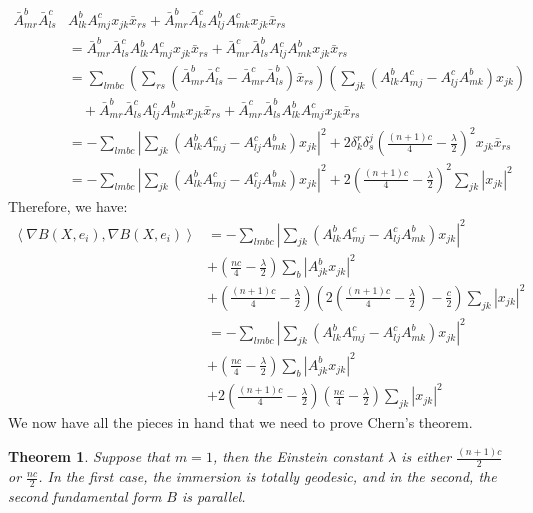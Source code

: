 \documentclass[11pt]{amsart}
\newtheorem{thm}[subsection]{Theorem}
\theoremstyle{definition}
\def \la { \left\langle }
\def \ra { \right\rangle }
\begin{document}
\begin{align*}
\bar{A}^b_{mr} \bar{A}^c_{ls} & A^b_{lk} A^c_{mj} x_{jk} \bar{x}_{rs} + \bar{A}^b_{mr} \bar{A}^c_{ls} A^b_{lj} A^c_{mk} x_{jk} \bar{x}_{rs} \\ 
&= \bar{A}^b_{mr} \bar{A}^c_{ls} A^b_{lk} A^c_{mj} x_{jk} \bar{x}_{rs} + \bar{A}^c_{mr} \bar{A}^b_{ls} A^c_{lj} A^b_{mk} x_{jk} \bar{x}_{rs} \\
&=  \sum_{lmbc} \left( \sum_{rs} ( \bar{A}^b_{mr} \bar{A}^c_{ls} - \bar{A}^c_{mr} \bar{A}^b_{ls} ) \bar{x}_{rs} \right) \left( \sum_{jk} ( A^b_{lk} A^c_{mj} -  A^c_{lj} A^b_{mk} ) x_{jk} \right)\\
&\quad +  \bar{A}^b_{mr} \bar{A}^c_{ls} A^c_{lj} A^b_{mk} x_{jk} \bar{x}_{rs} + \bar{A}^c_{mr} \bar{A}^b_{ls} A^b_{lk} A^c_{mj} x_{jk} \bar{x}_{rs} \\
&= - \sum_{lmbc} \left| \sum_{jk} \left( A^b_{lk} A^c_{mj} -  A^c_{lj} A^b_{mk}  \right) x_{jk} \right|^2 + 2 \delta^r_k \delta^j_s \left( \frac{(n+1)c}{4} - \frac{\lambda}{2} \right)^2 x_{jk} \bar{x}_{rs} \\
&= - \sum_{lmbc} \left| \sum_{jk} \left( A^b_{lk} A^c_{mj} -  A^c_{lj} A^b_{mk} \right) x_{jk} \right|^2 + 2 \left( \frac{(n+1)c}{4} - \frac{\lambda}{2} \right)^2 \sum_{jk} \left| x_{jk} \right|^2
\end{align*}
%
Therefore, we have:
%
\begin{align*}
\la \nabla B (X, e_i), \nabla B(X, e_i) \ra &= - \sum_{lmbc} \left| \sum_{jk} \left( A^b_{lk} A^c_{mj} -  A^c_{lj} A^b_{mk} \right) x_{jk} \right|^2 \\
&+ \left( \frac{nc}{4} - \frac{\lambda}{2} \right) \sum_{b} \left| A^b_{jk} x_{jk} \right|^2 \\
&+ \left( \frac{(n+1)c}{4} - \frac{\lambda}{2} \right) \left( 2 \left( \frac{(n+1)c}{4} - \frac{\lambda}{2} \right) - \frac{c}{2} \right) \sum_{jk} \left| x_{jk} \right|^2 \\
&=  - \sum_{lmbc} \left| \sum_{jk} \left( A^b_{lk} A^c_{mj} -  A^c_{lj} A^b_{mk} \right) x_{jk} \right|^2 \\
&+ \left( \frac{nc}{4} - \frac{\lambda}{2} \right) \sum_{b} \left| A^b_{jk} x_{jk} \right|^2 \\
&+ 2 \left( \frac{(n+1)c}{4} - \frac{\lambda}{2} \right) \left( \frac{nc}{4} - \frac{\lambda}{2} \right) \sum_{jk} \left| x_{jk} \right|^2
\end{align*}
%
We now have all the pieces in hand that we need to prove Chern's theorem.

\begin{thm} 
Suppose that $m=1$, then the Einstein constant $\lambda$ is either $\frac{(n+1)c}{2}$ or $\frac{nc}{2}$.  In the first case, the immersion is totally geodesic, and in the second, the second fundamental form $B$ is parallel. 
\end{thm}
\end{document}
